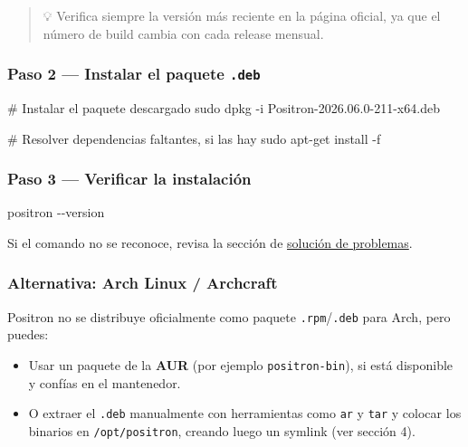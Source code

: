 \documentclass[
  doc,
  floatsintext,
  longtable,
  a4paper,
  nolmodern,
  notxfonts,
  notimes,
  12pt,
  colorlinks=true,linkcolor=blue,citecolor=blue,urlcolor=blue]{apa7}
\newenvironment{Shaded}{\begin{snugshade}}{\end{snugshade}}
\newcommand{\AttributeTok}[1]{\textcolor[rgb]{0.40,0.45,0.13}{#1}}
\newcommand{\CommentTok}[1]{\textcolor[rgb]{0.37,0.37,0.37}{#1}}
\newcommand{\ExtensionTok}[1]{\textcolor[rgb]{0.00,0.23,0.31}{#1}}
\newcommand{\FunctionTok}[1]{\textcolor[rgb]{0.28,0.35,0.67}{#1}}
\newcommand{\NormalTok}[1]{\textcolor[rgb]{0.00,0.23,0.31}{#1}}
\providecommand{\tightlist}{%
  \setlength{\itemsep}{0pt}\setlength{\parskip}{0pt}}
\begin{document}
\begin{quote}
💡 Verifica siempre la versión más reciente en la página oficial, ya que
el número de build cambia con cada release mensual.
\end{quote}

\subsubsection{\texorpdfstring{Paso 2 --- Instalar el paquete
\texttt{.deb}}{Paso 2 --- Instalar el paquete .deb}}\label{paso-2-instalar-el-paquete-.deb}

\begin{Shaded}
\begin{Highlighting}[]
\CommentTok{\# Instalar el paquete descargado}
\FunctionTok{sudo}\NormalTok{ dpkg }\AttributeTok{{-}i}\NormalTok{ Positron{-}2026.06.0{-}211{-}x64.deb}

\CommentTok{\# Resolver dependencias faltantes, si las hay}
\FunctionTok{sudo}\NormalTok{ apt{-}get install }\AttributeTok{{-}f}
\end{Highlighting}
\end{Shaded}

\subsubsection{Paso 3 --- Verificar la
instalación}\label{paso-3-verificar-la-instalaciuxf3n}

\begin{Shaded}
\begin{Highlighting}[]
\ExtensionTok{positron} \AttributeTok{{-}{-}version}
\end{Highlighting}
\end{Shaded}

Si el comando no se reconoce, revisa la sección de
\hyperref[16-soluciuxf3n-de-problemas-comunes]{solución de problemas}.

\subsubsection{Alternativa: Arch Linux /
Archcraft}\label{alternativa-arch-linux-archcraft}

Positron no se distribuye oficialmente como paquete
\texttt{.rpm}/\texttt{.deb} para Arch, pero puedes:

\begin{itemize}
\tightlist
\item
  Usar un paquete de la \textbf{AUR} (por ejemplo
  \texttt{positron-bin}), si está disponible y confías en el mantenedor.
\item
  O extraer el \texttt{.deb} manualmente con herramientas como
  \texttt{ar} y \texttt{tar} y colocar los binarios en
  \texttt{/opt/positron}, creando luego un symlink (ver sección 4).
\end{itemize}
\end{document}
